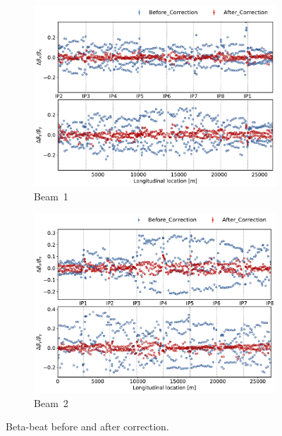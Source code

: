 \documentclass[a4paper]{cernatsnote}
\begin{document}
\begin{figure}[ht]
\begin{subfigure}{.5\textwidth}
  \centering
  \includegraphics[width=.8\linewidth]{plots/beam1/beta_beat_before_and_after_corr.pdf}  
  \caption{Beam~1}
  \label{fig:sub-first}
\end{subfigure}
\begin{subfigure}{.5\textwidth}
  \centering
  \includegraphics[width=.8\linewidth]{plots/beam2/beta_beat_before_after_correction.pdf}  
  \caption{Beam~2}
  \label{fig:sub-second}
\end{subfigure}
\caption{Beta-beat before and after correction.}
\label{fig:before_after_correction_beta_beat}
\end{figure}
\end{document}
